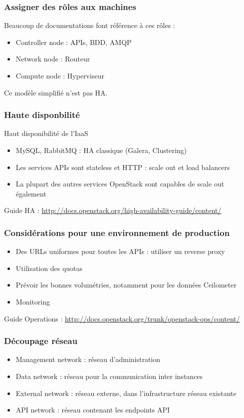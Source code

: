  \begin{frame}
    \frametitle{Assigner des rôles aux machines}
    Beaucoup de documentations font référence à ces rôles :
    \begin{itemize}
      \item Controller node : APIs, BDD, AMQP
      \item Network node : Routeur
      \item Compute node : Hyperviseur
    \end{itemize}
    Ce modèle simplifié n'est pas HA.
  \end{frame}

  \begin{frame}
    \frametitle{Haute disponbilité}
    Haut disponibilité de l'IaaS
    \begin{itemize}
      \item MySQL, RabbitMQ : HA classique (Galera, Clustering)
      \item Les services APIs sont stateless et HTTP : scale out et load balancers
      \item La plupart des autres services OpenStack sont capables de scale out également
    \end{itemize}
    Guide HA : \url{http://docs.openstack.org/high-availability-guide/content/}
  \end{frame}

  \begin{frame}
    \frametitle{Considérations pour une environnement de production}
    \begin{itemize}
      \item Des URLs uniformes pour toutes les APIs : utiliser un reverse proxy
      \item Utilisation des quotas
      \item Prévoir les bonnes volumétries, notamment pour les données Ceilometer
      \item Monitoring
    \end{itemize}
    Guide Operations : \url{http://docs.openstack.org/trunk/openstack-ops/content/}
  \end{frame}

  \begin{frame}
  \frametitle{Découpage réseau}
    \begin{itemize}
      \item Management network : réseau d'administration
      \item Data network : réseau pour la communication inter instances
      \item External network : réseau externe, dans l'infrastructure réseau existante
      \item API network : réseau contenant les endpoints API
    \end{itemize}
  \end{frame}

